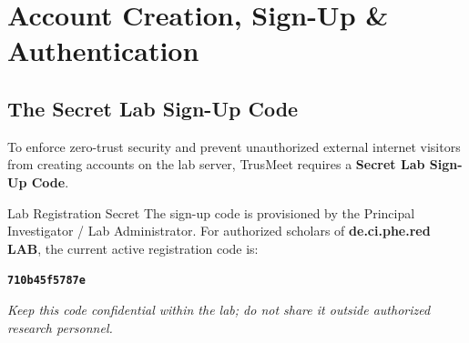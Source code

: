 \documentclass[11pt,a4paper]{report}
\begin{document}
\newpage
\chapter{Account Creation, Sign-Up \& Authentication}

\section{The Secret Lab Sign-Up Code}
To enforce zero-trust security and prevent unauthorized external internet visitors from creating accounts on the lab server, TrusMeet requires a \textbf{Secret Lab Sign-Up Code}.

\begin{infobox}{Lab Registration Secret}
The sign-up code is provisioned by the Principal Investigator / Lab Administrator. For authorized scholars of \textbf{de.ci.phe.red LAB}, the current active registration code is:
\begin{center}
\Large\texttt{\textbf{710b45f5787e}}
\end{center}
\textit{Keep this code confidential within the lab; do not share it outside authorized research personnel.}
\end{infobox}
\end{document}
